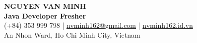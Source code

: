 \begin{center}
    {\fontsize{25}{28}\selectfont\bfseries NGUYEN VAN MINH}\\[4pt]
    {\large\bfseries Java Developer Fresher}\\[6pt]
    (+84) 353 999 798 \;|\; \href{mailto:nvminh162@gmail.com}{nvminh162@gmail.com} \;|\; \href{https://nvminh162.id.vn}{nvminh162.id.vn}\\[3pt]
    An Nhon Ward, Ho Chi Minh City, Vietnam
    \\ \vspace{-1pt}
\end{center}
